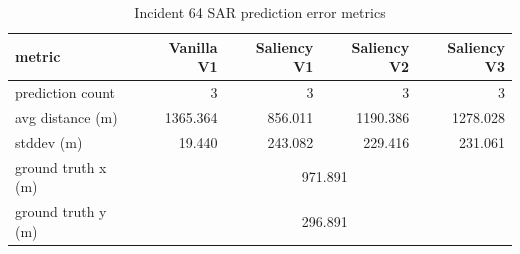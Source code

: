 \begin{table}[ht]
\centering
\caption{Incident 64 SAR prediction error metrics}
\label{tab:sar-incident-64}
\begin{tabular}{lrrrr}
\hline
metric & Vanilla V1 & Saliency V1 & Saliency V2 & Saliency V3 \\
\hline
prediction count & 3 & 3 & 3 & 3 \\
avg distance (m) & 1365.364 & 856.011 & 1190.386 & 1278.028 \\
stddev (m) & 19.440 & 243.082 & 229.416 & 231.061 \\
ground truth x (m) & \multicolumn{4}{c}{971.891} \\
ground truth y (m) & \multicolumn{4}{c}{296.891} \\
\hline
\end{tabular}
\end{table}
